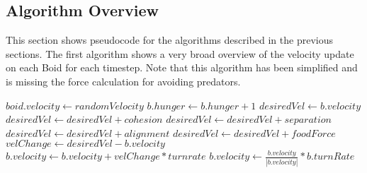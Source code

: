 \documentclass{egpubl}
\begin{document}
\subsection{Algorithm Overview}
This section shows pseudocode for the algorithms described in the previous sections. The first algorithm shows a very broad overview of the velocity update on each Boid for each timestep. Note that this algorithm has been simplified and is missing the force calculation for avoiding predators. 
\begin{algorithmic}
    \State $boid.velocity \gets randomVelocity$
\EndFor
{}
        \State $b.hunger \gets b.hunger + 1$
        \State $desiredVel \gets b.velocity$
        \State $desiredVel \gets desiredVel + cohesion$
        \State $desiredVel \gets desiredVel + separation$
        \State $desiredVel \gets desiredVel + alignment$
            \State $desiredVel \gets desiredVel + foodForce$
        \EndIf
        \State $velChange \gets desiredVel - b.velocity$
        \State $b.velocity \gets b.velocity + velChange * turnrate$
        \State $b.velocity \gets \frac{b.velocity}{|b.velocity|} * b.turnRate$
    \EndFor
\EndFor
\EndWhile
\end{algorithmic}
\end{document}
